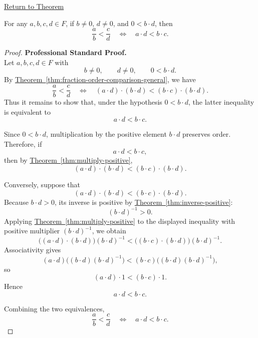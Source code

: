 \newpage
{}
\label{prf:fraction-order-comparison-positive-denominator-product}

\begin{remark*}[Return]
\hyperref[thm:fraction-order-comparison-positive-denominator-product]{Return to Theorem}
\end{remark*}

\begin{theorem*}
For any $a,b,c,d\in F$, if $b\neq 0$, $d\neq 0$, and $0<b\cdot d$, then
\[
\frac{a}{b}<\frac{c}{d}
\quad\Longleftrightarrow\quad
a\cdot d<b\cdot c.
\]
\end{theorem*}

\begin{proof}
\textbf{Professional Standard Proof.}~\\
Let $a,b,c,d\in F$ with
\[
b\neq 0,\qquad d\neq 0,\qquad 0<b\cdot d.
\]
By
\hyperref[thm:fraction-order-comparison-general]{Theorem~\ref*{thm:fraction-order-comparison-general}},
we have
\[
\frac{a}{b}<\frac{c}{d}
\quad\Longleftrightarrow\quad
(a\cdot d)\cdot(b\cdot d)<(b\cdot c)\cdot(b\cdot d).
\]
Thus it remains to show that, under the hypothesis $0<b\cdot d$, the latter
inequality is equivalent to
\[
a\cdot d<b\cdot c.
\]

Since $0<b\cdot d$, multiplication by the positive element $b\cdot d$
preserves order.  Therefore, if
\[
a\cdot d<b\cdot c,
\]
then by
\hyperref[thm:multiply-positive]{Theorem~\ref*{thm:multiply-positive}},
\[
(a\cdot d)\cdot(b\cdot d)<(b\cdot c)\cdot(b\cdot d).
\]

Conversely, suppose that
\[
(a\cdot d)\cdot(b\cdot d)<(b\cdot c)\cdot(b\cdot d).
\]
Because $b\cdot d>0$, its inverse is positive by
\hyperref[thm:inverse-positive]{Theorem~\ref*{thm:inverse-positive}}:
\[
(b\cdot d)^{-1}>0.
\]
Applying
\hyperref[thm:multiply-positive]{Theorem~\ref*{thm:multiply-positive}}
to the displayed inequality with positive multiplier $(b\cdot d)^{-1}$, we
obtain
\[
\bigl((a\cdot d)\cdot(b\cdot d)\bigr)(b\cdot d)^{-1}
<
\bigl((b\cdot c)\cdot(b\cdot d)\bigr)(b\cdot d)^{-1}.
\]
Associativity gives
\[
(a\cdot d)\bigl((b\cdot d)(b\cdot d)^{-1}\bigr)
<
(b\cdot c)\bigl((b\cdot d)(b\cdot d)^{-1}\bigr),
\]
so
\[
(a\cdot d)\cdot 1<(b\cdot c)\cdot 1.
\]
Hence
\[
a\cdot d<b\cdot c.
\]

Combining the two equivalences,
\[
\frac{a}{b}<\frac{c}{d}
\quad\Longleftrightarrow\quad
a\cdot d<b\cdot c.
\]
\end{proof}

